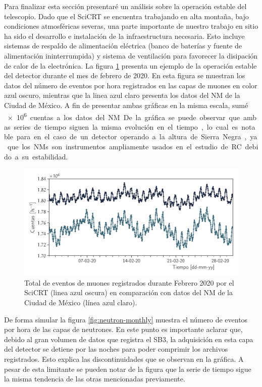Para finalizar esta sección presentaré un análisis sobre la operación estable del telescopio. Dado que el SciCRT se encuentra trabajando en alta montaña, bajo condiciones atmosféricas severas, una parte importante de nuestro trabajo en sitio ha sido el desarrollo e instalación de la infraestructura necesaria. Esto incluye sistemas de respaldo de alimentación eléctrica (banco de baterías y fuente de alimentación ininterrumpida) y sistema de ventilación para favorecer la disipación de calor de la electrónica. La figura \ref{fig:muon-monthly} presenta un ejemplo de la operación estable del detector durante el mes de febrero de \num{2020}. En esta figura se muestran los datos del número de eventos por hora registrados en las capas de muones en color azul oscuro, mientras que la linea azul claro presenta los datos del NM de la Ciudad de México. A fin de presentar ambas gráficas en la misma escala, sumé \SI{e6} cuentas a los datos del NM. De la gráfica se puede observar que ambas series de tiempo siguen la misma evolución en el tiempo, lo cual es notable para en el caso de un detector operando a la altura de Sierra Negra, ya que los NMs son instrumentos ampliamente usados en el estudio de RC debido a su estabilidad.

\begin{figure}
        \centering
        \includegraphics[width=\textwidth]{muon-monthly.pdf}
        \caption{Total de eventos de muones registrados durante Febrero \num{2020} por el SciCRT (linea azul oscura) en comparación con datos del NM de la Ciudad de México (línea azul claro).}
        \label{fig:muon-monthly}
\end{figure}

De forma simular la figura \ref{fig:neutron-monthly} muestra el número de eventos por hora de las capas de neutrones. En este punto es importante aclarar que, debido al gran volumen de datos que registra el SB3, la adquisición en esta capa del detector se detiene por las noches para poder comprimir los archivos registrados. Esto explica las discontinuidades que se observan en la gráfica. A pesar de esta limitante se pueden notar de la figura que la serie de tiempo sigue la misma tendencia de las otras mencionadas previamente.

